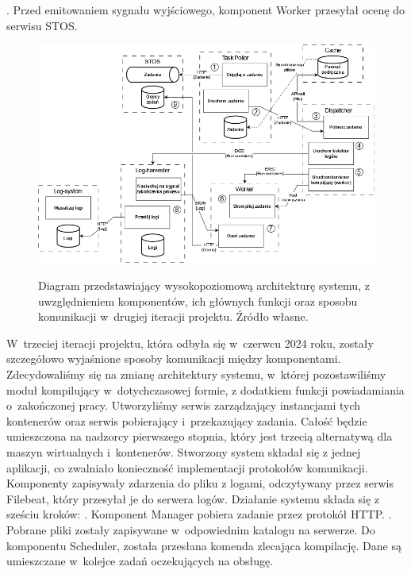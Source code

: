 \newline {}. Przed emitowaniem sygnału wyjściowego, komponent Worker przesyłał ocenę do serwisu STOS.
\begin{figure}[!h]
	\begin{center}
		\resizebox{1.0\textwidth}{!} {
			\includegraphics{img/1/i2_arch.png}
		}
		\caption[Architektura po drugiej iteracji]{Diagram przedstawiający wysokopoziomową architekturę systemu, z uwzględnieniem komponentów, ich głównych funkcji oraz sposobu komunikacji w~drugiej iteracji projektu. Źródło własne.}
	\end{center}
\end{figure}
\newline \indent W~trzeciej iteracji projektu, która odbyła się w~czerwcu 2024 roku, zostały szczegółowo wyjaśnione sposoby komunikacji między komponentami. Zdecydowaliśmy się na zmianę architektury systemu, w~której pozostawiliśmy moduł kompilujący w~dotychczasowej formie, z dodatkiem funkcji powiadamiania o~zakończonej pracy. Utworzyliśmy serwis zarządzający instancjami tych kontenerów oraz serwis pobierający i~przekazujący zadania. Całość będzie umieszczona na nadzorcy pierwszego stopnia, który jest trzecią alternatywą dla maszyn wirtualnych i~kontenerów. Stworzony system składał się z jednej aplikacji, co zwalniało konieczność implementacji protokołów komunikacji. Komponenty zapisywały zdarzenia do pliku z logami, odczytywany przez serwis Filebeat, który przesyłał je do serwera logów. Działanie systemu składa się z sześciu kroków:
\newline {}. Komponent Manager pobiera zadanie przez protokół HTTP.
\newline {}. Pobrane pliki zostały zapisywane w~odpowiednim katalogu na serwerze. Do komponentu Scheduler, została przesłana komenda zlecająca kompilację. Dane są umieszczane w~kolejce zadań oczekujących na obsługę.
